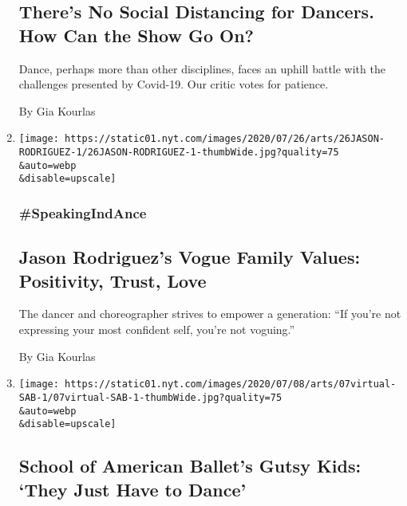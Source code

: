 \begin{enumerate}
  \hypertarget{theres-no-social-distancing-for-dancers-how-can-the-show-go-on}{%
  \subsection{There's No Social Distancing for Dancers. How Can the Show
  Go
  On?}\label{theres-no-social-distancing-for-dancers-how-can-the-show-go-on}}

  Dance, perhaps more than other disciplines, faces an uphill battle
  with the challenges presented by Covid-19. Our critic votes for
  patience.

  By Gia Kourlas
\item
  \href{/2020/07/24/arts/dance/jason-rodriguez-vogue-pose.html}{}

  \texttt{[image: https://static01.nyt.com/images/2020/07/26/arts/26JASON-RODRIGUEZ-1/26JASON-RODRIGUEZ-1-thumbWide.jpg?quality=75\\\&auto=webp\\\&disable=upscale]}

  \hypertarget{speakingindance}{%
  \subsubsection{\#SpeakingIndAnce}\label{speakingindance}}

  \hypertarget{jason-rodriguezs-vogue-family-values-positivity-trust-love}{%
  \subsection{Jason Rodriguez's Vogue Family Values: Positivity, Trust,
  Love}\label{jason-rodriguezs-vogue-family-values-positivity-trust-love}}

  The dancer and choreographer strives to empower a generation: ``If
  you're not expressing your most confident self, you're not voguing.''

  By Gia Kourlas
\item
  \href{/2020/07/07/arts/dance/school-of-american-ballet-workshop-performances.html}{}

  \texttt{[image: https://static01.nyt.com/images/2020/07/08/arts/07virtual-SAB-1/07virtual-SAB-1-thumbWide.jpg?quality=75\\\&auto=webp\\\&disable=upscale]}

  \hypertarget{school-of-american-ballets-gutsy-kids-they-just-have-to-dance}{%
  \subsection{School of American Ballet's Gutsy Kids: `They Just Have to
  Dance'}\label{school-of-american-ballets-gutsy-kids-they-just-have-to-dance}}


\end{enumerate}
